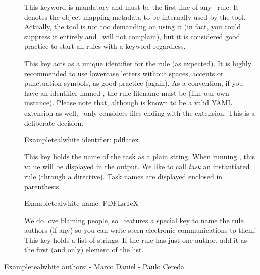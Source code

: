 \begin{description}
\item[] This keyword is mandatory and must be the first line of any \arara\ rule. It denotes the object mapping metadata to be internally used by the tool. Actually, the tool is not too demanding on using it (in fact, you could suppress it entirely and \arara\ will not complain), but it is considered good practice to start all rules with a  keyword regardless.

\item[] This key acts as a unique identifier for the rule (as expected). It is highly recommended to use lowercase letters without spaces, accents or punctuation symbols, as good practice (again). As a convention, if you have an identifier named , the rule filename must be  (like our own instance). Please note that, although  is known to be a valid YAML extension as well, \arara\ only considers files ending with the  extension. This is a deliberate decision.

\begin{codebox}{Example}{teal}{\icnote}{white}
identifier: pdflatex
\end{codebox}

\item[] This key holds the name of the task as a plain string. When running \arara, this value will be displayed in the output. We like to call \emph{task} an instantiated rule (through a directive). Task names are displayed enclosed in parenthesis.

\begin{codebox}{Example}{teal}{\icnote}{white}
name: PDFLaTeX
\end{codebox}

\item[] We do love blaming people, so \arara\ features a special key to name the rule authors (if any) so you can write stern electronic communications to them! This key holds a list of strings. If the rule has just one author, add it as the first (and only) element of the list.
\end{description}

\begin{codebox}{Example}{teal}{\icnote}{white}
authors:
- Marco Daniel
- Paulo Cereda
\end{codebox}

%
%

